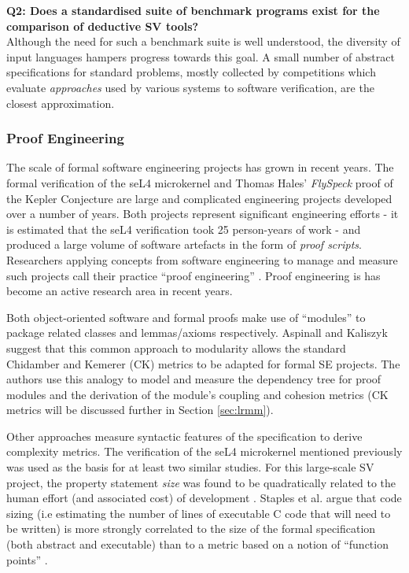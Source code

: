 \textbf{Q2: Does a standardised suite of benchmark programs exist for the comparison of deductive SV tools?} \\
Although the need for such a benchmark suite is well understood, the diversity of input languages hampers progress towards this goal. 
A small number of abstract specifications for standard problems, mostly collected by competitions which evaluate \textit{approaches} used by various systems to software verification, are the closest approximation.  

\subsubsection{Proof Engineering}
\label{sub:lrsvmmpe}

The scale of formal software engineering projects has grown in recent years. The formal verification of the seL4 microkernel \cite{Klein:2014:CFV} and Thomas Hales' \textit{FlySpeck} proof of the Kepler Conjecture \cite{hales-kepler} are large and complicated engineering projects developed over a number of years. Both projects represent significant engineering efforts - it is estimated that the seL4 verification took 25 person-years of work - and produced a large volume of software artefacts in the form of \textit{proof scripts}. Researchers applying concepts from software engineering to manage and measure such projects call their practice ``proof engineering'' \cite{Klein2014}. Proof engineering is has become an active research area in recent years. 

Both object-oriented software and formal proofs make use of ``modules'' to package related classes and lemmas/axioms respectively. Aspinall and Kaliszyk \cite{Aspinall2016} suggest that this common approach to modularity allows the standard Chidamber and Kemerer \cite{CandK} (CK) metrics to be adapted for formal SE projects. The authors use this analogy to model and measure the dependency tree for proof modules and the derivation of the module's coupling and cohesion metrics (CK metrics will be discussed further in Section \ref{sec:lrmm}).

Other approaches measure syntactic features of the specification to derive complexity metrics. The verification of the seL4 microkernel mentioned previously was used as the basis for at least two similar studies. For this large-scale SV project, the property statement \textit{size} was found to be quadratically related to the human effort (and associated cost) of development \cite{CostIndicator}. Staples et al. argue that code sizing (i.e estimating the number of lines of executable C code that will need to be written) is more strongly correlated to the size of the formal specification (both abstract and executable) than to a metric based on a notion of ``function points'' \cite{Staples:2013}.
   
